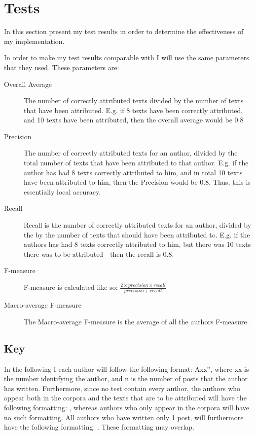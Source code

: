 \section{Tests}
\label{tests}

In this section present my test results in order to determine the effectiveness of my implementation.

In order to make my test results comparable with \cite{nr4} I will use the same parameters that they used. These parameters are: 

\begin{description}
\item[Overall Average] The number of correctly attributed texts divided by the number of texts that have been attributed. E.g. if 8 texts have been correctly attributed, and 10 texts have been attributed, then the overall average would be 0.8 

\item[Precision] The number of correctly attributed texts for an author, divided by the total number of texts that have been attributed to that author. E.g. if the author has had 8 texts correctly attributed to him, and in total 10 texts have been attributed to him, then the Precision would be 0.8. Thus, this is essentially local accuracy.

\item[Recall] Recall is the number of correctly attributed texts for an author, divided by the by the number of texts that should have been attributed to. E.g. if the authors has had 8 texts correctly attributed to him, but there was 10 texts there was to be attributed - then the recall is 0.8.

\item[F-measure] F-measure is calculated like so: $\frac{2 \times precision \times recall}{precision+recall}$ 

\item[Macro-average F-measure] The Macro-average F-measure is the average of all the authors F-measure. 
\end{description}

\subsection*{Key}
In the following I each author will follow the following format: Axx$^{n}$, where xx is the number identifying the author, and n is the number of posts that the author has written. Furthermore, since no test contain every author, the authors who appear both in the corpora and the texts that are to be attributed will have the following formatting: , whereas authors who only appear in the corpora will have no such formatting. All authors who have written only 1 post, will furthermore have the following formatting: . These formatting may overlap.\\

